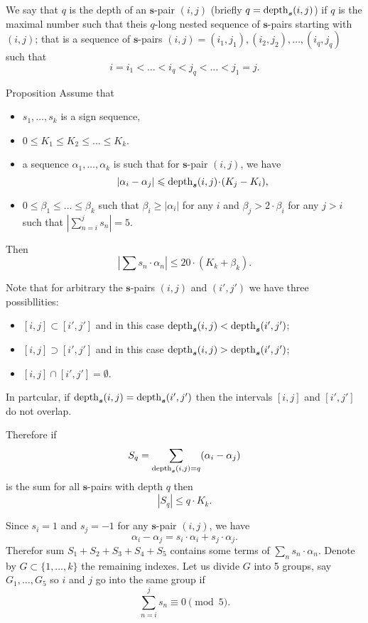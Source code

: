 \documentclass[a4paper,10pt]{amsart}
\begin{document}
We say that $q$ is the depth of an $\bm{s}$-pair $(i,j)$
(briefly $q=\mathop{\rm depth}\nolimits_{\bm{s}}(i,j)$) 
if $q$ is the maximal number such that theis $q$-long nested sequence of $\bm{s}$-pairs starting with $(i,j)$; 
that is a sequence of $\bm{s}$-pairs
$(i,j)=(i_1,j_1),(i_2,j_2),\dots,(i_q,j_q)$ such that
\[i=i_1<\dots<i_q<j_q<\dots<j_1=j.\]

\begin{thm}{Proposition}
Assume that
\begin{itemize}
\item $s_1,\dots, s_k$ is a sign sequence,
\item $0\le K_1\le K_2\le \dots\le K_k$.
\item a sequence $\alpha_1,\dots,\alpha_k$ is such that for $\bm{s}$-pair $(i,j)$, we have
\[|\alpha_i-\alpha_j|\le \depth_{\bm{s}}(i,j)\cdot(K_j-K_i),\]
\item $0\le \beta_1\le\dots\le\beta_k$ such that $\beta_i\ge |\alpha_i|$ for any $i$ and $\beta_j>2\cdot\beta_i$ for any $j>i$ such that $|\sum_{n=i}^js_n|=5$.
\end{itemize}
Then
\[|\sum s_n\cdot \alpha_n|\le 20\cdot( K_k+ \beta_k).\]

\end{thm}

Note that for arbitrary the $\bm{s}$-pairs $(i,j)$ and $(i',j')$
we have three possibllities:
\begin{itemize}
\item $[i,j]\subset [i',j']$ and in this case $\mathop{\rm depth}\nolimits_{\bm{s}}(i,j)<\mathop{\rm depth}\nolimits_{\bm{s}}(i',j')$;
\item $[i,j]\supset [i',j']$ and in this case $\mathop{\rm depth}\nolimits_{\bm{s}}(i,j)>\mathop{\rm depth}\nolimits_{\bm{s}}(i',j')$;
\item $[i,j]\cap [i',j']=\emptyset$.
\end{itemize}
In partcular, if $\mathop{\rm depth}\nolimits_{\bm{s}}(i,j)=\mathop{\rm depth}\nolimits_{\bm{s}}(i',j')$ then the intervals $[i,j]$ and $[i',j']$ do not overlap.


Therefore if 
\[S_q=\sum_{\mathop{\rm depth}\nolimits_{\bm{s}}(i,j)=q} (\alpha_i-\alpha_j)\] 
is the sum for all $\bm{s}$-pairs with depth $q$ then 
\[|S_q|\le q\cdot K_k.\]

Since $s_i=1$ and $s_j=-1$ for any $\bm{s}$-pair $(i,j)$,
we have
\[\alpha_i-\alpha_j=s_i\cdot\alpha_i+s_j\cdot\alpha_j.\]
Therefor sum  $S_1+S_2+S_3+S_4+S_5$  contains some  terms of 
$\sum_{n} s_n\cdot \alpha_n$.
Denote by $G\subset\{1,\dots,k\}$ the remaining indexes.
Let us divide $G$ into 5 groups, say $G_1,\dots,G_5$ 
so $i$ and $j$ go into the same group if 
\[\sum_{n=i}^j s_n\equiv 0\pmod 5.\]
\end{document}
